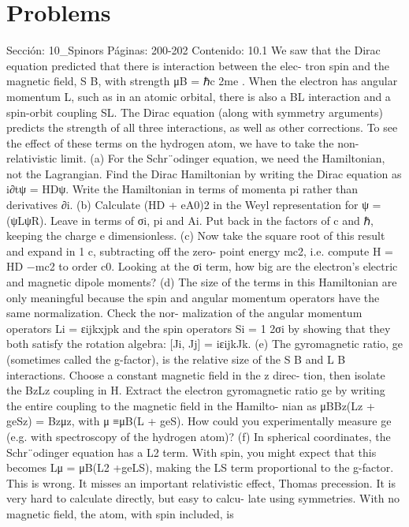 \section*{Problems}
Sección: 10_Spinors
Páginas: 200-202
Contenido:
10.1 We saw that the Dirac equation predicted that there is interaction between the elec-
tron spin and the magnetic ﬁeld, ⃗S ⃗B, with strength μB =
ℏc
2me . When the electron
has angular momentum ⃗L, such as in an atomic orbital, there is also a ⃗B⃗L interaction
and a spin-orbit coupling ⃗S⃗L. The Dirac equation (along with symmetry arguments)
predicts the strength of all three interactions, as well as other corrections. To see the
effect of these terms on the hydrogen atom, we have to take the non-relativistic limit.
(a) For the Schr¨odinger equation, we need the Hamiltonian, not the Lagrangian.
Find the Dirac Hamiltonian by writing the Dirac equation as i∂tψ = HDψ.
Write the Hamiltonian in terms of momenta pi rather than derivatives ∂i.
(b) Calculate (HD + eA0)2 in the Weyl representation for ψ = (ψLψR). Leave in
terms of σi, pi and Ai. Put back in the factors of c and ℏ, keeping the charge e
dimensionless.
(c) Now take the square root of this result and expand in 1
c, subtracting off the zero-
point energy mc2, i.e. compute H = HD −mc2 to order c0. Looking at the σi
term, how big are the electron’s electric and magnetic dipole moments?
(d) The size of the terms in this Hamiltonian are only meaningful because the spin
and angular momentum operators have the same normalization. Check the nor-
malization of the angular momentum operators Li = εijkxjpk and the spin
operators Si =
1
2σi
by showing that they both satisfy the rotation algebra:
[Ji, Jj] = iεijkJk.
(e) The gyromagnetic ratio, ge (sometimes called the g-factor), is the relative size
of the ⃗S ⃗B and ⃗L ⃗B interactions. Choose a constant magnetic ﬁeld in the z direc-
tion, then isolate the BzLz coupling in H. Extract the electron gyromagnetic
ratio ge by writing the entire coupling to the magnetic ﬁeld in the Hamilto-
nian as μBBz(Lz + geSz) = Bzμz, with ⃗μ ≡μB(⃗L + ge⃗S). How could you
experimentally measure ge (e.g. with spectroscopy of the hydrogen atom)?
(f) In spherical coordinates, the Schr¨odinger equation has a ⃗L2 term. With spin,
you might expect that this becomes ⃗L⃗μ = μB(⃗L2 +ge⃗L⃗S), making the ⃗L⃗S term
proportional to the g-factor. This is wrong. It misses an important relativistic
effect, Thomas precession. It is very hard to calculate directly, but easy to calcu-
late using symmetries. With no magnetic ﬁeld, the atom, with spin included, is
